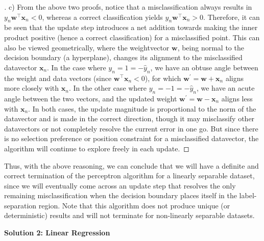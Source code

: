 \documentclass{article}
\renewcommand{\vec}[1]{\mathbf{#1}}
\begin{document}
    \begin{proof}[\unskip\nopunct]
        c) From the above two proofs, notice that a misclassification always 
        results in $y_n\vec{w}^\top \vec{x}_n < 0$, whereas 
        a correct classification yields $y_n\vec{w}^\top \vec{x}_n
        > 0$. Therefore, it can be seen that the update step introduces a net
        addition towards making the inner product positive (hence a correct 
        classification) for a misclassified point. 
        This can also be viewed geometrically, where
        the weightvector $\vec{w}$, being normal to the decision boundary (a 
        hyperplane), changes its alignment to the misclassified datavector 
        $\vec{x}_n$. In the case where $y_n = 1 = -\hat{y}_n$, we have an 
        obtuse angle between the  weight and data vectors (since $\vec
        {w}^\top \vec{x}_n < 0$), for which $\vec{w} ^{\prime} = \vec{w}+
        \vec{x}_n$ aligns more closely with $\vec{x}_n$. In the other case 
        where $y_n = -1 = -\hat{y}_n$, we have an acute angle between the two
        vectors, and the updated weight $\vec{w}^{\prime} =
        \vec{w} - \vec{x}_n$ aligns less with $\vec{x}_n$. In both cases, the
        update magnitude is proportional to the norm of the datavector and 
        is made in the correct direction, though it may misclassify other 
        datavectors or not completely resolve the current error in one go.
        But since there is no selection preference or position constraint for 
        a misclassified datavector, the algorithm will continue to explore 
        freely in each update.
    \end{proof}

    Thus, with the above reasoning, we can conclude that we will have a
    definite and correct termination of the perceptron algorithm for a 
    linearly separable dataset, since we will eventually come across an
    update step that resolves the only remaining misclassification when the
    decision boundary places itself in the label-separation region. Note that
    this algorithm does not produce unique (or deterministic) results and 
    will not terminate for non-linearly separable datasets.
    
    \vspace{0.5cm}

    \textbf{Solution 2: Linear Regression}
\end{document}
